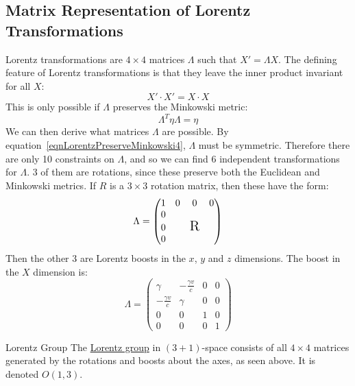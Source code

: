 \documentclass[../Main.tex]{subfiles}
\begin{document}
\subsection{Matrix Representation of Lorentz Transformations}
Lorentz transformations are $4\times 4$ matrices $\Lambda$ such that $X' = \Lambda X$. The defining feature of Lorentz transformations is that they leave the inner product invariant for all $X$:
\begin{equation*}
    X'\cdot X' = X \cdot X
\end{equation*}
This is only possible if $\Lambda$ preserves the Minkowski metric:
\begin{equation}
    \Lambda^T \eta \Lambda = \eta
    \label{eqnLorentzPreserveMinkowski4}
\end{equation}
We can then derive what matrices $\Lambda$ are possible. By equation~\ref{eqnLorentzPreserveMinkowski4}, $\Lambda$ must be symmetric. Therefore there are only 10 constraints on $\Lambda$, and so we can find 6 independent transformations for $\Lambda$.
3 of them are rotations, since these preserve both the Euclidean and Minkowski metrics. If $R$ is a $3\times 3$ rotation matrix, then these have the form:
\begin{equation*}
    \Lambda =
    \begin{pmatrix}
        1 & 0 & 0 & 0 \\
        0 &   &   &   \\
        0 &   & \text{\Large R} &   \\
        0 &   &   &   \\
    \end{pmatrix}
\end{equation*}
Then the other 3 are Lorentz boosts in the $x$, $y$ and $z$ dimensions. The boost in the $X$ dimension is:
\begin{equation*}
    \Lambda =
    \begin{pmatrix}
        \gamma & -\frac{\gamma v}{c} & 0 & 0 \\
        -\frac{\gamma v}{c} & \gamma & 0 & 0 \\
        0 & 0 & 1 & 0 \\
        0 & 0 & 0 & 1
    \end{pmatrix}
\end{equation*}
\begin{definition}{Lorentz Group}
    The \underline{Lorentz group} in $(3+1)$-space consists of all $4\times 4$ matrices generated by the rotations and boosts about the axes, as seen above.
    It is denoted $O(1, 3)$.
\end{definition}
\end{document}
